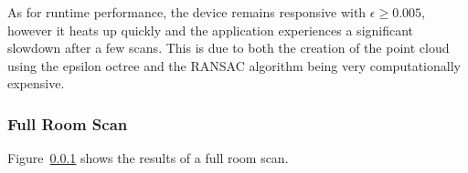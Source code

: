 As for runtime performance, the device remains responsive with $\epsilon\geq0.005$, however it heats
up quickly and the application experiences a significant slowdown after a few scans.
This is due to both the creation of the point cloud using the epsilon octree and the RANSAC algorithm being
very computationally expensive.

\subsubsection{Full Room Scan}

Figure~\ref{} shows the results of a full room scan.

